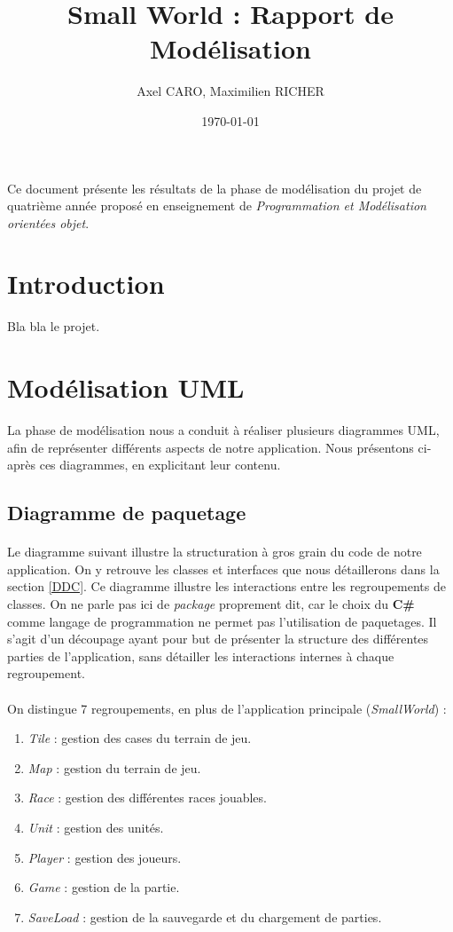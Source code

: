 \documentclass[a4paper]{article}
\title{Small World : Rapport de Modélisation}
\author{Axel CARO, Maximilien RICHER}
\date{\today}
\begin{document}
\maketitle

\paragraph{}
Ce document présente les résultats de la phase de modélisation du projet de quatrième année proposé en enseignement de \textit{Programmation et Modélisation orientées objet}.

\section{Introduction}
Bla bla le projet.

\section{Modélisation UML}
La phase de modélisation nous a conduit à réaliser plusieurs diagrammes UML, afin de représenter différents aspects de notre application. Nous présentons ci-après ces diagrammes, en explicitant leur contenu.

\subsection{Diagramme de paquetage}
\paragraph{}
Le diagramme suivant illustre la structuration à gros grain du code de notre application. On y retrouve les classes et interfaces que nous détaillerons dans la section \ref{DDC}. Ce diagramme illustre les interactions entre les regroupements de classes. On ne parle pas ici de \textit{package} proprement dit, car le choix du \textbf{C\#} comme langage de programmation ne permet pas l'utilisation de paquetages. Il s'agit d'un découpage ayant pour but de présenter la structure des différentes parties de l'application, sans détailler les interactions internes à chaque regroupement.

\paragraph{}
On distingue 7 regroupements, en plus de l'application principale (\textit{SmallWorld}) :
\begin{enumerate}
\item \textit{Tile} : gestion des cases du terrain de jeu.
\item \textit{Map} : gestion du terrain de jeu.
\item \textit{Race} : gestion des différentes races jouables.
\item \textit{Unit} : gestion des unités.
\item \textit{Player} : gestion des joueurs.
\item \textit{Game} : gestion de la partie.
\item \textit{SaveLoad} : gestion de la sauvegarde et du chargement de parties.
\end{enumerate}
\end{document}
